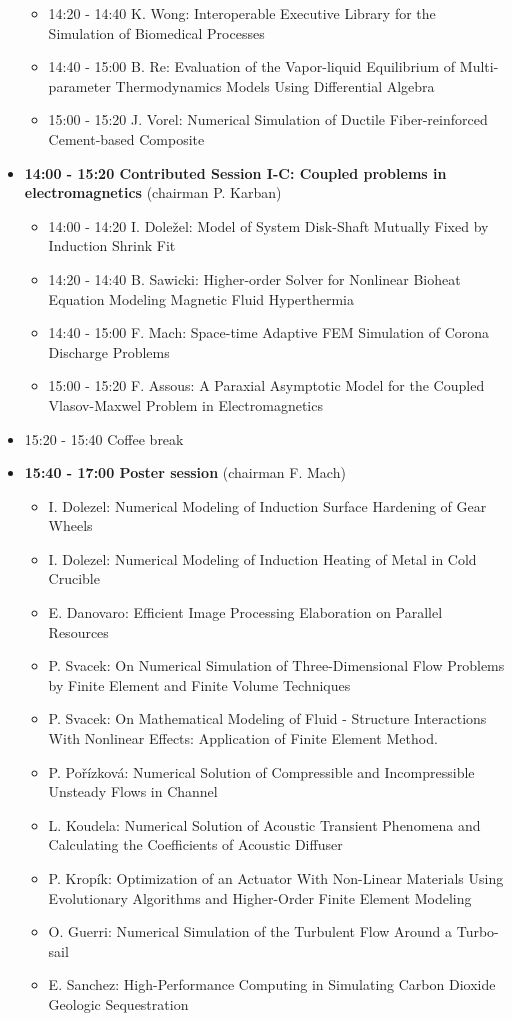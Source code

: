 \documentclass[10pt, A4]{article}%
\begin{document}
\begin{itemize}
\begin{itemize}
    \item 14:20 - 14:40 {K. Wong}: {Interoperable Executive Library for the Simulation of Biomedical Processes}
    \item 14:40 - 15:00 {B. Re}: {Evaluation of the Vapor-liquid Equilibrium of Multi-parameter Thermodynamics Models Using Differential Algebra}
    \item 15:00 - 15:20 {J. Vorel}: {Numerical Simulation of Ductile Fiber-reinforced Cement-based Composite}
  \end{itemize}
    \item {\bf 14:00 - 15:20 Contributed Session I-C: Coupled problems in electromagnetics} (chairman P. Karban) 
  \begin{itemize}
    \item 14:00 - 14:20 {I. Doležel}: {Model of System Disk-Shaft Mutually Fixed by Induction Shrink Fit}
    \item 14:20 - 14:40 {B. Sawicki}: {Higher-order Solver for Nonlinear Bioheat Equation Modeling Magnetic Fluid Hyperthermia}
    \item 14:40 - 15:00 {F. Mach}: {Space-time Adaptive FEM Simulation of Corona Discharge Problems}
    \item 15:00 - 15:20 {F. Assous}: {A Paraxial Asymptotic Model for the Coupled Vlasov-Maxwel Problem in Electromagnetics}  %
    \end{itemize}
  \item 15:20 - 15:40 Coffee break
  \newpage
  \item {\bf 15:40 - 17:00 Poster session} (chairman F. Mach)
  \begin{itemize}
    \item {I. Dolezel}: {Numerical Modeling of Induction Surface Hardening of Gear Wheels}
    \item {I. Dolezel}: {Numerical Modeling of Induction Heating of Metal in Cold Crucible}
    \item {E. Danovaro}: {Efficient Image Processing Elaboration on Parallel Resources}
	\item {P. Svacek}: {On Numerical Simulation of Three-Dimensional Flow Problems by Finite Element and Finite Volume Techniques}
	\item {P. Svacek}: {On Mathematical Modeling of Fluid - Structure Interactions With Nonlinear Effects: Application of Finite Element Method.}
    \item {P. Pořízková}: {Numerical Solution of Compressible and Incompressible Unsteady Flows in Channel}
    \item {L. Koudela}: {Numerical Solution of Acoustic Transient Phenomena and Calculating the Coefficients of Acoustic Diffuser}
    \item {P. Kropík}: {Optimization of an Actuator With Non-Linear Materials Using Evolutionary Algorithms and Higher-Order Finite Element Modeling}
    \item {O. Guerri}: {Numerical Simulation of the Turbulent Flow Around a Turbo-sail}
    \item {E. Sanchez}: {High-Performance Computing in Simulating Carbon Dioxide Geologic Sequestration}
  \end{itemize}
   

\end{itemize}
\end{document}

